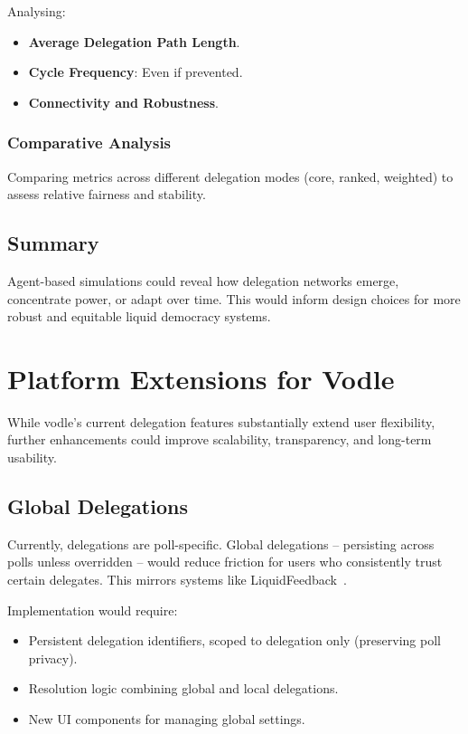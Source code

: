 Analysing:

\begin{itemize}
    \item \textbf{Average Delegation Path Length}.
    \item \textbf{Cycle Frequency}: Even if prevented.
    \item \textbf{Connectivity and Robustness}.
\end{itemize}

\subsubsection{Comparative Analysis}

Comparing metrics across different delegation modes (core, ranked, weighted) to assess relative fairness and stability.

\subsection{Summary}

Agent-based simulations could reveal how delegation networks emerge, concentrate power, or adapt over time. This would inform design choices for more robust and equitable liquid democracy systems.

\section{Platform Extensions for Vodle}

While vodle's current delegation features substantially extend user flexibility, further enhancements could improve scalability, transparency, and long-term usability.

\subsection{Global Delegations}

Currently, delegations are poll-specific. Global delegations -- persisting across polls unless overridden -- would reduce friction for users who consistently trust certain delegates. This mirrors systems like LiquidFeedback~\citep{behrens_liquidfeedback_2014}.

Implementation would require:

\begin{itemize}
    \item Persistent delegation identifiers, scoped to delegation only (preserving poll privacy).
    \item Resolution logic combining global and local delegations.
    \item New UI components for managing global settings.
\end{itemize}

